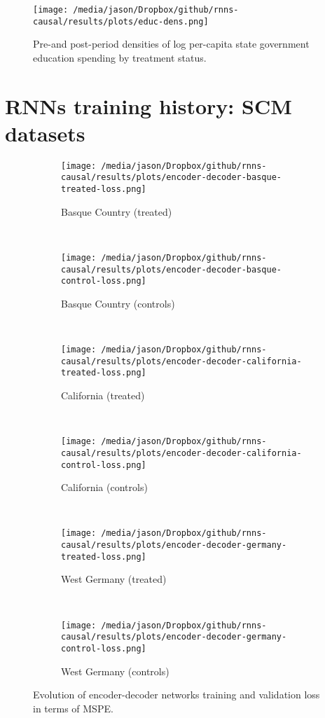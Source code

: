 \documentclass[12pt]{article}
\begin{document}
\begin{figure}[htbp]
	\begin{center}
		\texttt{[image: /media/jason/Dropbox/github/rnns-causal/results/plots/educ-dens.png]} \\
		\caption{Pre-and post-period densities of log per-capita state government education spending by treatment status.  \label{educ-dense}} 
	\end{center}
\end{figure}

\section{RNNs training history: SCM datasets}

\begin{figure*}[htbp]
    \centering
    \begin{subfigure}[t]{0.4\textwidth}
        \centering
        \texttt{[image: /media/jason/Dropbox/github/rnns-causal/results/plots/encoder-decoder-basque-treated-loss.png]}
        \caption{Basque Country (treated) \label{encoder-decoder-loss-basque-treated}} 
    \end{subfigure}
    ~ 
        \begin{subfigure}[t]{0.4\textwidth}
        \centering
        \texttt{[image: /media/jason/Dropbox/github/rnns-causal/results/plots/encoder-decoder-basque-control-loss.png]}
        \caption{Basque Country (controls)}
    \end{subfigure}
    ~ %
    \begin{subfigure}[t]{0.4\textwidth}
        \centering
        \texttt{[image: /media/jason/Dropbox/github/rnns-causal/results/plots/encoder-decoder-california-treated-loss.png]}
        \caption{California (treated)}
    \end{subfigure}
            ~ 
    \begin{subfigure}[t]{0.4\textwidth}
        \centering
        \texttt{[image: /media/jason/Dropbox/github/rnns-causal/results/plots/encoder-decoder-california-control-loss.png]}
        \caption{California (controls)}
    \end{subfigure}
            ~ %
    \begin{subfigure}[t]{0.4\textwidth}
        \centering
        \texttt{[image: /media/jason/Dropbox/github/rnns-causal/results/plots/encoder-decoder-germany-treated-loss.png]}
        \caption{West Germany (treated)}
    \end{subfigure}
            ~ 
    \begin{subfigure}[t]{0.4\textwidth}
        \centering
        \texttt{[image: /media/jason/Dropbox/github/rnns-causal/results/plots/encoder-decoder-germany-control-loss.png]}
        \caption{West Germany (controls)}
    \end{subfigure}
\caption{Evolution of encoder-decoder networks training and validation loss in terms of MSPE. \label{encoder-decoder-loss-scm}} 
\end{figure*}
\end{document}
